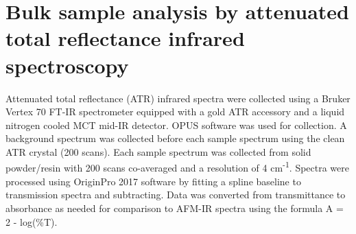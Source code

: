 
\section[Bulk sample analysis by ATR FT-IR]{Bulk sample analysis by attenuated total reflectance infrared spectroscopy}
\label{section2.5}

Attenuated total reflectance (ATR) infrared spectra were collected using a Bruker Vertex 70 FT-IR spectrometer equipped with a gold ATR accessory and a liquid nitrogen cooled MCT mid-IR detector. OPUS software was used for collection. A background spectrum was collected before each sample spectrum using the clean ATR crystal (200 scans). Each sample spectrum was collected from solid powder/resin with 200 scans co-averaged and a resolution of 4 cm\textsuperscript{-1}. Spectra were processed using OriginPro 2017 software by fitting a spline baseline to transmission spectra and subtracting. Data was converted from transmittance to absorbance as needed for comparison to AFM-IR spectra using the formula A = 2 - log(\%T).


